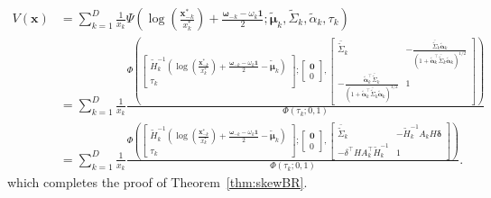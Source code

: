 \documentclass[12pt]{article}
\begin{document}
\begin{align*}
V(\bm x) &= \sum_{k=1}^D \frac{1}{x_k}
\Psi \left( \log \left( \frac{\bm x^*_{-k}}{x^*_k} \right) + \frac{\bm\omega_{-k} - \omega_k\bm 1}{2} ; \tilde{\bm \mu}_k, \tilde\Sigma_k, \tilde{\alpha}_k, \tau_k \right) \\
%
&= \sum_{k=1}^D \frac{1}{x_k} 
\frac{\Phi \left(
    \begin{bmatrix} 
        \tilde H_k^{-1}\left( \log \left( \frac{\bm x^*_{-k}}{x^*_k} \right) + \frac{\bm \omega_{-k} - \omega_k\bm 1}{2} - \tilde{\bm \mu}_k\right)  \\
        \tau_k
    \end{bmatrix};
    \begin{bmatrix} 
    \bm 0 \\ 0
    \end{bmatrix},
    \begin{bmatrix}
        \bar{\tilde\Sigma}_k & -\frac{\bar{\tilde\Sigma}_k \tilde{\bm\alpha}_k}{(1+\tilde{\bm\alpha}_k^\top\bar{\tilde\Sigma}_k \tilde{\bm\alpha}_k)^{1/2}} \\
       -\frac{\tilde{\bm\alpha}_k^\top\bar{\tilde\Sigma}_k}{\left(1+\tilde{\bm\alpha}_k^\top\bar{\tilde\Sigma}_k \tilde{\bm\alpha}_k\right)^{1/2}} &	1
    \end{bmatrix} \right)
    }
    {\Phi\left(\tau_k; 0, 1\right)} \\
&= \sum_{k=1}^D \frac{1}{x_k} 
\frac{\Phi \left(
    \begin{bmatrix} 
        \tilde H_k^{-1}\left( \log \left( \frac{\bm x^*_{-k}}{x^*_k} \right) + \frac{\bm\omega_{-k} - \omega_k\bm 1}{2} - \tilde{\bm \mu}_k\right)  \\
        \tau_k
    \end{bmatrix};
    \begin{bmatrix} 
    \bm 0 \\ 0
    \end{bmatrix},
    \begin{bmatrix}
        \bar{\tilde\Sigma}_k & - \tilde H_k^{-1} A_k H \bm \delta \\
       - \delta^\top H A_k^\top \tilde H_k^{-1} &	1
    \end{bmatrix} \right)
    }
    {\Phi\left(\tau_k; 0, 1\right)}.
\end{align*}
%
which completes the proof of Theorem~\ref{thm:skewBR}.
\end{document}
